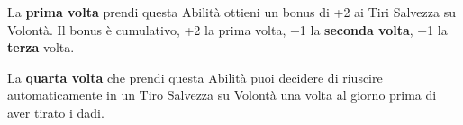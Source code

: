 \begin{multicols}{2}
La \textbf{prima volta} prendi questa Abilità ottieni un bonus di +2 ai Tiri Salvezza su Volontà. Il bonus è cumulativo, +2 la prima volta, +1 la \textbf{seconda volta}, +1 la \textbf{terza} volta.

La \textbf{quarta volta} che prendi questa Abilità puoi decidere di riuscire automaticamente in un Tiro Salvezza su Volontà una volta al giorno prima di aver tirato i dadi.


\end{multicols}




\vfill

